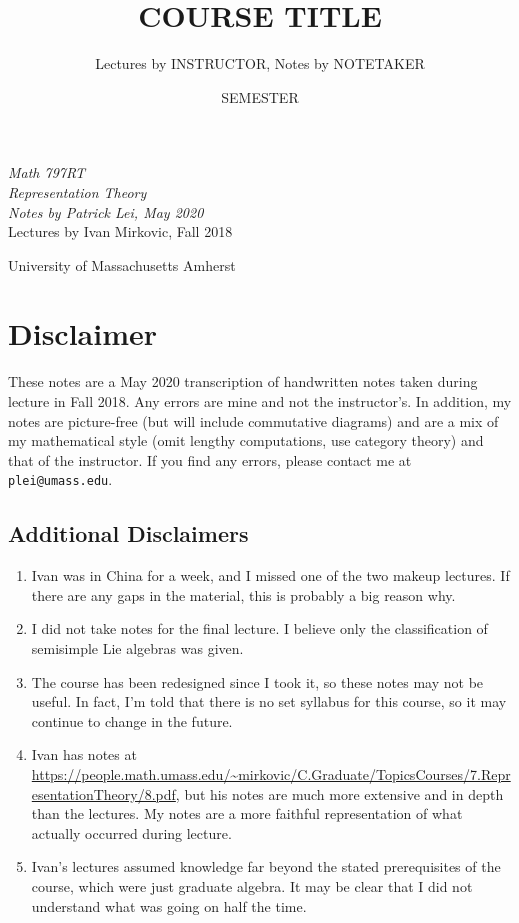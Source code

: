 \documentclass[leqno, openany]{memoir}
\title{COURSE TITLE}
\author{Lectures by INSTRUCTOR, Notes by NOTETAKER}
\date{SEMESTER}
\theoremstyle{definition}
\theoremstyle{remark}
\theoremstyle{plain}
\theoremstyle{definition}
\theoremstyle{remark}
\newcommand*{\titleSW}
    {\begingroup%
    \raggedleft
    \vspace*{\baselineskip}
    {\Huge\itshape Math 797RT \\ Representation Theory}\\[\baselineskip]
    {\large\itshape Notes by Patrick Lei,
                    May 2020}\\[0.2\textheight]
    {\Large Lectures by Ivan Mirkovic, Fall 2018}\par
    \vfill
    {\Large \sffamily University of Massachusetts Amherst}
    \vspace*{\baselineskip}
\endgroup}
\begin{document}
    
\begin{titlingpage}
\titleSW
\end{titlingpage}

\thispagestyle{empty}
\section*{Disclaimer}%
\label{sec:disclaimer}

These notes are a May 2020 transcription of handwritten notes taken during lecture in Fall 2018.
Any errors are mine and not the instructor's. 
In addition, my notes are picture-free (but will include commutative diagrams) and are a mix of my mathematical style 
(omit lengthy computations, use category theory) and that of the instructor.
If you find any errors, please contact me at \texttt{plei@umass.edu}.

\subsection*{Additional Disclaimers}%
\label{sub:additional_disclaimers}

\begin{enumerate}
    \item Ivan was in China for a week, and I missed one of the two makeup lectures. If there are any gaps in the material, this is probably a big reason why.
    \item I did not take notes for the final lecture. I believe only the classification of semisimple Lie algebras was given.
    \item The course has been redesigned since I took it, so these notes may not be useful. In fact, I'm told that there is no set syllabus for this course, so it may continue to change in the future.
    \item Ivan has notes at \url{https://people.math.umass.edu/~mirkovic/C.Graduate/TopicsCourses/7.RepresentationTheory/8.pdf}, but his notes are much more extensive and in depth than the lectures. My notes are a more faithful representation of what actually occurred during lecture.
    \item Ivan's lectures assumed knowledge far beyond the stated prerequisites of the course, which were just graduate algebra. It may be clear that I did not understand what was going on half the time.
\end{enumerate}
\newpage



\tableofcontents
\end{document}
